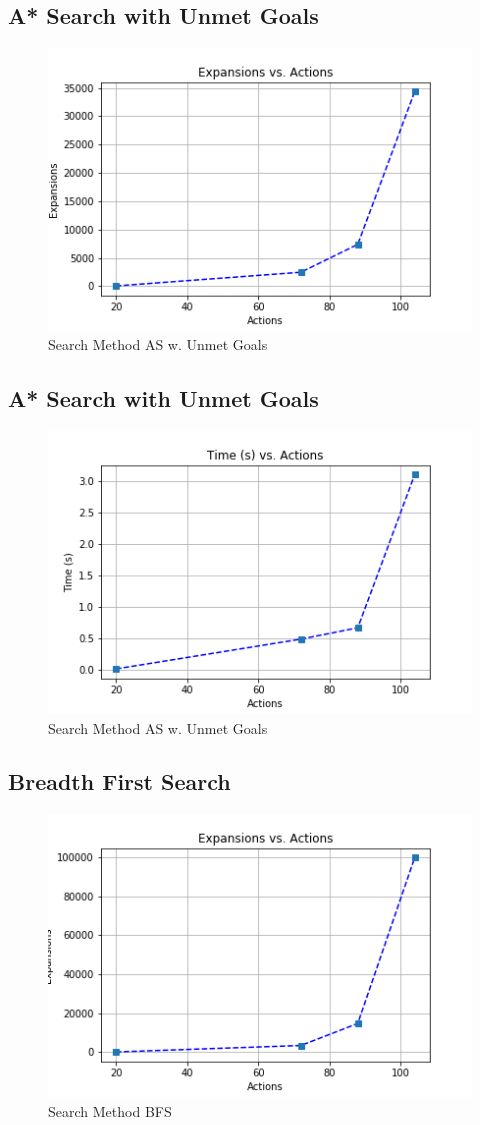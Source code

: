 \documentclass[a4paper]{article}
\begin{document}
\subsection{A* Search with Unmet Goals}

\begin{figure}[htpb]
\begin{center}
\includegraphics[width=0.5\columnwidth]{fig/results_934.png}
\caption{Search Method AS w. Unmet Goals}
\end{center}
\label{fig934}
\end{figure}
        

\subsection{A* Search with Unmet Goals}

\begin{figure}[htpb]
\begin{center}
\includegraphics[width=0.5\columnwidth]{fig/results_931.png}
\caption{Search Method AS w. Unmet Goals}
\end{center}
\label{fig931}
\end{figure}
        

\subsection{Breadth First Search}

\begin{figure}[htpb]
\begin{center}
\includegraphics[width=0.5\columnwidth]{fig/results_1034.png}
\caption{Search Method BFS}
\end{center}
\label{fig1034}
\end{figure}
        
\end{document}
